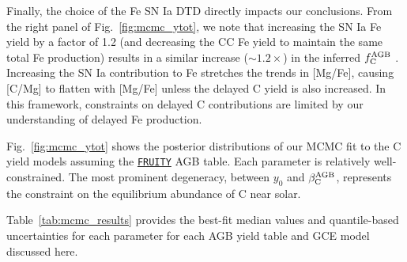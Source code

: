 \documentclass[fleqn,
usenatbib]{mnras}
\newcommand{\fruity}{\texttt{\hyperlink{fruity}{FRUITY}}}
\newcommand{\Yct}{{y_{\rm C}^{\rm  tot}}}
\newcommand{\aagb}{\beta_{\rm C}^{\rm AGB}}
\newcommand{\fagb}{f_{\rm C}^{\rm AGB}}
\newcommand{\yo}{y_0}
\newcommand{\yl}{y_{\rm low}}
\newcommand{\zcc}{\zeta_{\rm C}^{\rm CC}}
\begin{document}
{Finally, the choice of the Fe SN Ia DTD directly impacts our conclusions.  From the right panel of Fig.~\ref{fig:mcmc_ytot}, we note that increasing the SN Ia Fe yield by a factor of 1.2 (and decreasing the CC Fe yield to maintain the same total Fe production) results in a similar increase (${\sim}1.2\times$) in the inferred $\fagb$ . Increasing the SN Ia contribution to Fe stretches the trends in [Mg/Fe], causing [C/Mg] to flatten with [Mg/Fe] unless the delayed C yield is also increased. In this framework, constraints on delayed C contributions are limited by our understanding of delayed Fe production.

Fig.~\ref{fig:mcmc_ytot} shows the posterior distributions of our MCMC fit to the C yield models assuming the \fruity{} AGB table. Each parameter is relatively well-constrained. The most prominent degeneracy, between $\yo$ and $\aagb$, represents the constraint on the equilibrium abundance of C near solar. 

Table~\ref{tab:mcmc_results} provides the best-fit median values and quantile-based uncertainties for each parameter for each AGB yield table and GCE model discussed here. 

\begin{table}
    \caption{
        Best-fit parameters (medians and 16-84th percentile ranges) from our MCMC fit for each model discussed.
        The columns are:  the model name, best-fitting log posterior probability $\log p$, AGB scaling $\aagb$, CCSN low-metallicity yield $\yl$, the CCSN yield slope $\zcc$, the AGB fraction $\fagb$, and the total C yield at solar metallicity $\Yct$. 
    }
    \label{tab:mcmc_results}


\end{table}}
\end{document}
